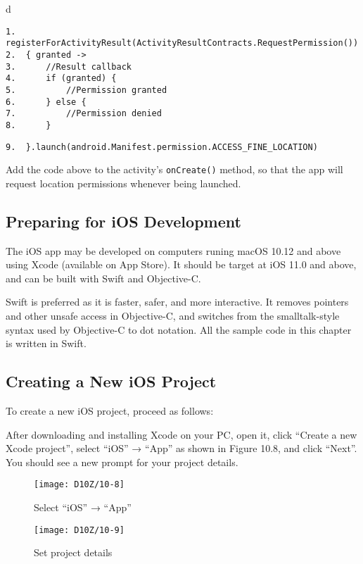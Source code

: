 \documentclass[a4paper,12pt]{book}
\begin{document}
\begin{codebloc}
\begin{tabular}{d}
\vspace{2pt}
\begin{verbatim}
1.  registerForActivityResult(ActivityResultContracts.RequestPermission()) 
2.  { granted ->
3.      //Result callback
4.      if (granted) {
5.          //Permission granted
6.      } else {
7.          //Permission denied
8.      }
\end{verbatim}
\verb|9.  }.launch(android.Manifest.permission.ACCESS_FINE_LOCATION)|
\end{tabular}
\end{codebloc}

Add the code above to the activity’s \verb|onCreate()| method, so that the app will request location permissions whenever being launched.

\subsection{Preparing for iOS Development}
The iOS app may be developed on computers runing macOS 10.12 and above using Xcode (available on App Store). It should be target at iOS 11.0 and above, and can be built with Swift and Objective-C.

Swift is preferred as it is faster, safer, and more interactive. It removes pointers and other unsafe access in Objective-C, and switches from the smalltalk-style syntax used by Objective-C to dot notation. All the sample code in this chapter is written in Swift.

\subsection{Creating a New iOS Project}
To create a new iOS project, proceed as follows:

After downloading and installing Xcode on your PC, open it, click “Create a new Xcode project”, select “iOS” → “App” as shown in Figure 10.8, and click “Next”. You should see a new prompt for your project details.

\begin{figure}[ht]
    \centering
    \texttt{[image: D10Z/10-8]}
    \caption{Select “iOS” → “App”}
\end{figure}

\begin{figure}[h!]
    \centering
    \texttt{[image: D10Z/10-9]}
    \caption{Set project details}
\end{figure}
\end{document}
